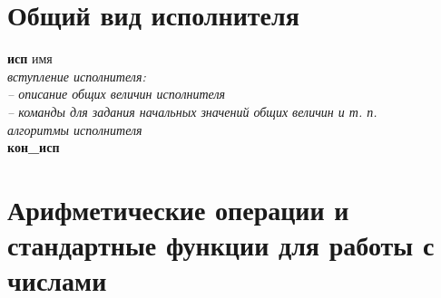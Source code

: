 \section{Общий вид исполнителя}
{\sffamily
\textbf{исп} имя\\
\otstup \textit{вступление исполнителя:}\\
\otstup \textit{\quad -- описание общих величин исполнителя}\\
\otstup \textit{\quad -- команды для задания начальных значений общих величин и т. п.}\\
\otstup \textit{алгоритмы исполнителя}\\
\textbf{кон\_исп}}

\section{Арифметические операции и стандартные функции для работы с числами}
\label{standard-operations}
